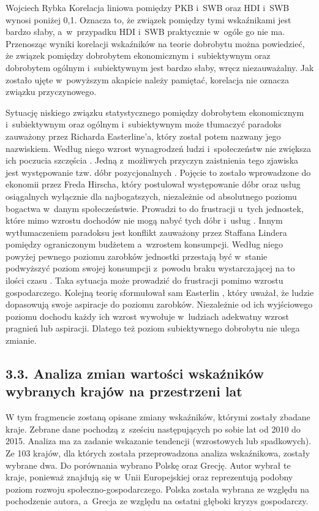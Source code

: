 \begin{artplenv}{Wojciech Rybka}
Korelacja liniowa pomiędzy PKB i~SWB oraz HDI i~SWB wynosi poniżej 0,1. Oznacza to, że związek pomiędzy tymi wskaźnikami
jest bardzo słaby, a~w~przypadku HDI i~SWB praktycznie w~ogóle go nie ma. Przenosząc wyniki korelacji wskaźników na
teorie dobrobytu można powiedzieć, że związek pomiędzy dobrobytem ekonomicznym i~subiektywnym oraz dobrobytem
ogólnym i~subiektywnym jest bardzo słaby, wręcz niezauważalny. Jak zostało ujęte w~powyższym akapicie należy pamiętać,
korelacja nie oznacza związku przyczynowego. 

Sytuację niskiego związku statystycznego pomiędzy dobrobytem ekonomicznym  i~subiektywnym oraz ogólnym i~subiektywnym
może tłumaczyć paradoks zauważony przez Richarda Easterline'a, który został potem nazwany jego nazwiskiem. Według niego
wzrost wynagrodzeń ludzi i~społeczeństw nie zwiększa ich poczucia szczęścia
\parencite{czapinski_ekonomia_2012}.
Jedną z~możliwych przyczyn zaistnienia tego zjawiska jest występowanie tzw. dóbr pozycjonalnych
\parencite{ostrowski_czy_2012}.
Pojęcie to zostało wprowadzone do ekonomii przez Freda Hirscha, który
postulował występowanie dóbr oraz usług osiągalnych wyłącznie dla najbogatszych, niezależnie od absolutnego poziomu
bogactwa w~danym społeczeństwie. Prowadzi to do frustracji u~tych jednostek, które mimo wzrostu dochodów nie mogą nabyć
tych dóbr i~usług
\parencite{hirsch_social_2005}.
Innym wytłumaczeniem paradoksu jest konflikt zauważony przez
Staffana Lindera pomiędzy ograniczonym budżetem a~wzrostem konsumpcji. Według niego powyżej pewnego poziomu zarobków
jednostki przestają być w~stanie podwyższyć poziom swojej konsumpcji z~powodu braku wystarczającej na to ilości czasu
\parencite{linder_harried_1970}.
Taka sytuacja może prowadzić do frustracji pomimo wzrostu gospodarczego.
Kolejną teorię sformułował sam Easterlin
\parencite*{easterlin_income_2001},
który uważał, że ludzie dopasowują swoje
aspiracje do poziomu zarobków. Niezależnie od ich wyjściowego poziomu dochodu każdy ich wzrost wywołuje w~ludziach
adekwatny wzrost pragnień lub aspiracji. Dlatego też poziom subiektywnego dobrobytu nie ulega zmianie.

\subsection{3.3. Analiza zmian wartości wskaźników wybranych krajów na przestrzeni lat}
W tym fragmencie zostaną opisane zmiany wskaźników, którymi zostały zbadane kraje. Zebrane dane pochodzą z~sześciu
następujących po sobie lat od 2010 do 2015. Analiza ma za zadanie wskazanie tendencji (wzrostowych lub spadkowych). Ze
103 krajów, dla których została przeprowadzona analiza wskaźnikowa, zostały wybrane dwa. Do porównania wybrano
Polskę oraz Grecję. Autor wybrał te kraje, ponieważ znajdują się w~Unii Europejskiej oraz
reprezentują podobny poziom rozwoju społeczno-gospodarczego. Polska została wybrana ze względu na pochodzenie autora,
a~Grecja ze względu na ostatni głęboki kryzys gospodarczy. 


\end{artplenv}
